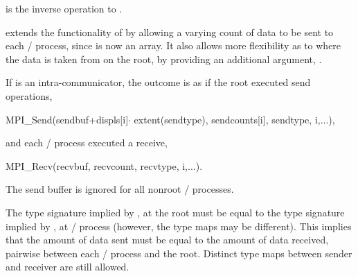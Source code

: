 
 is the inverse operation to .

 extends the functionality of 
by allowing a varying count of data to be sent to each \MPI/ process,
since  is now an array.
It also allows more flexibility as to where the data
is taken from on the root, by providing
an additional
argument, .

If  is an intra-communicator,
the outcome is as if the root executed  send operations,
\begin{mpicodeblock}
MPI\_Send(sendbuf+displs[i]$\cdot$ extent(sendtype), sendcounts[i],
sendtype, i,...),
\end{mpicodeblock}
\noindent and each \MPI/ process executed a receive,
\begin{mpicodeblock}
MPI\_Recv(recvbuf, recvcount, recvtype, i,...).
\end{mpicodeblock}


The send buffer is ignored for all nonroot \MPI/ processes.

The type signature implied by \mpicode{[i]},  at the root
must be equal to the type signature implied by
,  at \MPI/ process
 (however, the type maps may be different).
This implies that the amount of data sent must be equal to the
amount of data received, pairwise between each \MPI/ process and the root.
Distinct type maps between sender and receiver are still allowed.

